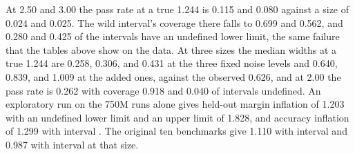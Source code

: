 At 2.50 and 3.00 the pass rate at a true 1.244 is 0.115 and 0.080 against a size of 0.024 and 0.025. The wild interval's coverage there falls to 0.699 and 0.562, and 0.280 and 0.425 of the intervals have an undefined lower limit, the same failure that the tables above show on the data. At three sizes the median widths at a true 1.244 are 0.258, 0.306, and 0.431 at the three fixed noise levels and 0.640, 0.839, and 1.009 at the added ones, against the observed 0.626, and at 2.00 the pass rate is 0.262 with coverage 0.918 and 0.040 of intervals undefined. An exploratory run on the 750M runs alone gives held-out margin inflation of 1.203 with an undefined lower limit and an upper limit of 1.828, and accuracy inflation of 1.299 with interval . The original ten benchmarks give 1.110 with interval  and 0.987 with interval  at that size.


